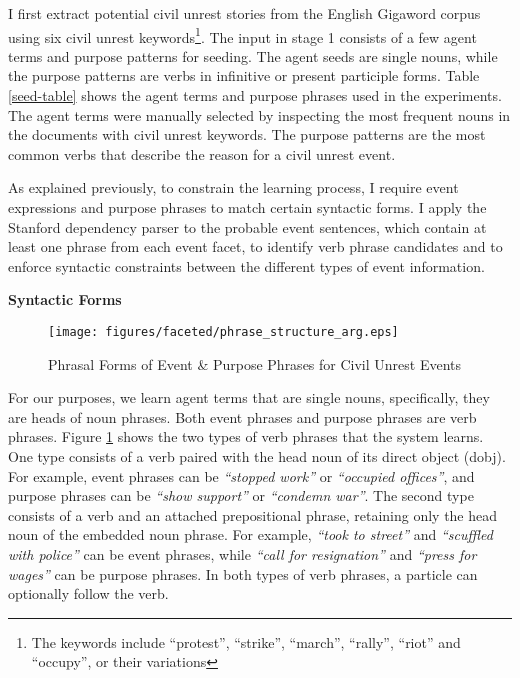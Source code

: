 I first extract potential civil unrest stories from the English Gigaword
corpus \cite{Gigaword} using six civil unrest keywords\footnote{The keywords include ``protest'',
``strike'', ``march'', ``rally'', ``riot'' and ``occupy'', 
or their variations}. 
The input in stage 1 consists of a few 
agent terms and
purpose 
patterns 
for seeding. The  agent seeds are single nouns, while the purpose
patterns are verbs in infinitive or present participle forms.  Table
\ref{seed-table} shows the agent terms and purpose 
phrases
used in the experiments.  The agent terms were manually selected by
inspecting the most frequent nouns in the documents with civil unrest
keywords.  The purpose patterns are the most common verbs that
describe the reason for a civil unrest event. 

As explained previously, to constrain the learning process, I require event expressions and
purpose phrases to match certain syntactic forms. 
I apply the Stanford dependency parser \cite{Marneffe06} to the probable event sentences, 
which contain at least one phrase from each event facet, 
to identify verb phrase candidates
and to enforce
syntactic constraints between the different types of event information. 

\vspace{.1in}
{\bf Syntactic Forms}
\vspace{.1in}

\begin{figure}[htbp]
 \centering
 \texttt{[image: figures/faceted/phrase\_structure\_arg.eps]}
 \caption{Phrasal Forms of Event \& Purpose Phrases for Civil Unrest Events}
\label{phrase-syntax}
\end{figure} 
For our purposes, we learn agent terms that are single nouns, 
specifically, they are heads of noun phrases. 
Both event phrases and purpose phrases are verb phrases.
Figure \ref{phrase-syntax} shows the 
two types of verb phrases that the system learns.  One type consists of a verb paired with
the head noun of its direct object (dobj). For example, event phrases can be {\it ``stopped work''}
or {\it ``occupied offices''}, and purpose phrases can be {\it ``show support''}
or {\it ``condemn war''}.  The second type consists of a verb and an attached
prepositional phrase, retaining only the head noun of the embedded noun phrase.
For example, {\it ``took to street''} and {\it ``scuffled
with police''} can be event phrases, while {\it ``call for resignation''} and
{\it ``press for wages''} can be purpose phrases.  In both types of verb phrases, a particle can
optionally follow the verb.  

